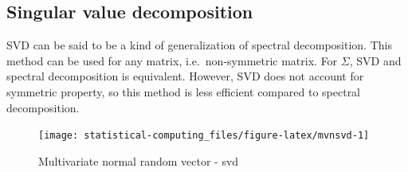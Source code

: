 \documentclass[]{book}
\newenvironment{Shaded}{\begin{snugshade}}{\end{snugshade}}
\newcommand{\ControlFlowTok}[1]{\textcolor[rgb]{0.13,0.29,0.53}{\textbf{#1}}}
\newcommand{\DataTypeTok}[1]{\textcolor[rgb]{0.13,0.29,0.53}{#1}}
\newcommand{\DecValTok}[1]{\textcolor[rgb]{0.00,0.00,0.81}{#1}}
\newcommand{\KeywordTok}[1]{\textcolor[rgb]{0.13,0.29,0.53}{\textbf{#1}}}
\newcommand{\NormalTok}[1]{#1}
\newcommand{\OperatorTok}[1]{\textcolor[rgb]{0.81,0.36,0.00}{\textbf{#1}}}
\newcommand{\OtherTok}[1]{\textcolor[rgb]{0.56,0.35,0.01}{#1}}
\newcommand{\StringTok}[1]{\textcolor[rgb]{0.31,0.60,0.02}{#1}}
\theoremstyle{definition}
\theoremstyle{definition}
\theoremstyle{definition}
\theoremstyle{remark}
\begin{document}
\hypertarget{singular-value-decomposition}{%
\subsection{Singular value decomposition}\label{singular-value-decomposition}}

SVD can be said to be a kind of generalization of spectral decomposition. This method can be used for any matrix, i.e.~non-symmetric matrix. For \(\Sigma\), SVD and spectral decomposition is equivalent. However, SVD does not account for symmetric property, so this method is less efficient compared to spectral decomposition.

\begin{Shaded}
\end{Shaded}

\begin{figure}[H]

{\centering \texttt{[image: statistical-computing\_files/figure-latex/mvnsvd-1]} 

}

\caption{Multivariate normal random vector - svd}\label{fig:mvnsvd}
\end{figure}
\end{document}
